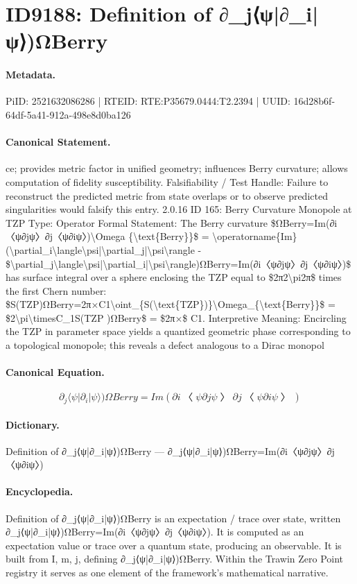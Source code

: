 \section*{ID9188: Definition of ∂\_j⟨ψ|∂\_i|ψ⟩)ΩBerry}
\paragraph{Metadata.}
PiID: 2521632086286 | RTEID: RTE:P35679.0444:T2.2394 | UUID: 16d28b6f-64df-5a41-912a-498e8d0ba126

\paragraph{Canonical Statement.}
ce; provides metric factor in unified geometry; influences Berry curvature; allows computation of fidelity susceptibility. Falsifiability / Test Handle: Failure to reconstruct the predicted metric from state overlaps or to observe predicted singularities would falsify this entry. 2.0.16 ID 165: Berry Curvature Monopole at TZP Type: Operator Formal Statement: The Berry curvature \$ΩBerry=Im(∂i〈ψ∂jψ〉∂j〈ψ∂iψ〉)\textbackslash{}Omega \{\textbackslash{}text\{Berry\}\}\$ = \textbackslash{}operatorname\{Im\}(\textbackslash{}partial\_i\textbackslash{}langle\textbackslash{}psi|\textbackslash{}partial\_j|\textbackslash{}psi\textbackslash{}rangle - \$\textbackslash{}partial\_j\textbackslash{}langle\textbackslash{}psi|\textbackslash{}partial\_i|\textbackslash{}psi\textbackslash{}rangle)ΩBerry=Im(∂i〈ψ∂jψ〉∂j〈ψ∂iψ〉)\$ has surface integral over a sphere enclosing the TZP equal to \$2π2\textbackslash{}pi2π\$ times the first Chern number: \$S(TZP)ΩBerry=2π×C1\textbackslash{}oint\_\{S(\textbackslash{}text\{TZP\})\}\textbackslash{}Omega\_\{\textbackslash{}text\{Berry\}\}\$ = \$2\textbackslash{}pi\textbackslash{}timesC\_1S(TZP )ΩBerry\$ = \$2π×\$ C1. Interpretive Meaning: Encircling the TZP in parameter space yields a quantized geometric phase corresponding to a topological monopole; this reveals a defect analogous to a Dirac monopol

\paragraph{Canonical Equation.}
\[
\partial_j\langle\psi|\partial_i|\psi\rangle)ΩBerry=Im(∂i〈ψ∂jψ〉∂j〈ψ∂iψ〉)
\]

\paragraph{Dictionary.}
Definition of ∂\_j⟨ψ|∂\_i|ψ⟩)ΩBerry — ∂\_j⟨ψ|∂\_i|ψ⟩)ΩBerry=Im(∂i〈ψ∂jψ〉∂j〈ψ∂iψ〉)

\paragraph{Encyclopedia.}
Definition of ∂\_j⟨ψ|∂\_i|ψ⟩)ΩBerry is an expectation / trace over state, written ∂\_j⟨ψ|∂\_i|ψ⟩)ΩBerry=Im(∂i〈ψ∂jψ〉∂j〈ψ∂iψ〉). It is computed as an expectation value or trace over a quantum state, producing an observable. It is built from I, m, j, defining ∂\_j⟨ψ|∂\_i|ψ⟩)ΩBerry. Within the Trawin Zero Point registry it serves as one element of the framework's mathematical narrative.
